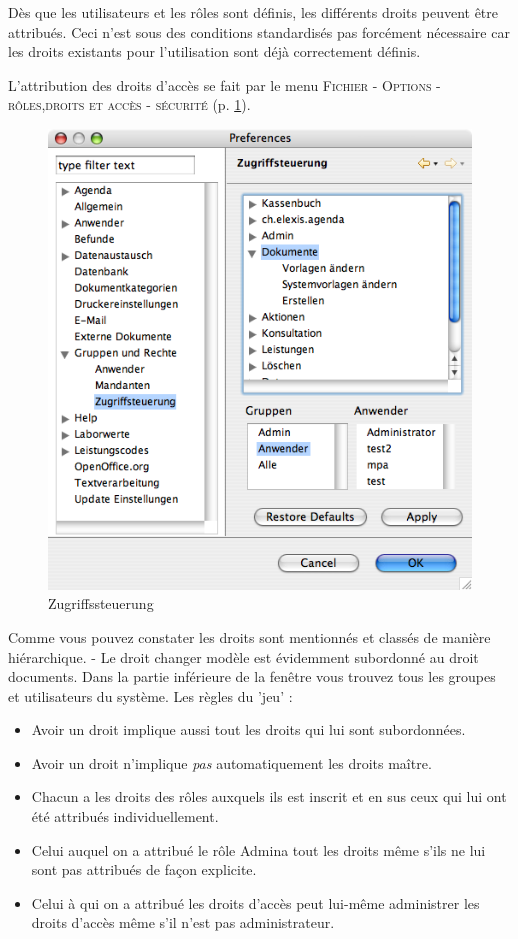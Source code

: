 Dès que les utilisateurs et les rôles sont définis, les différents droits peuvent être attribués. Ceci n'est sous des conditions standardisés pas forcément nécessaire car les droits existants pour l'utilisation sont déjà correctement définis.

L'attribution des droits d'accès se fait par le menu \textsc{Fichier -
Options - rôles,droits et accès  - sécurité} (p. \ref{fig:zugriff}).
\begin{figure}[htp]
\begin{center}
  \includegraphics{images/zugriff}
  \caption{Zugriffssteuerung}
  \label{fig:zugriff}
\end{center}
\end{figure}

Comme vous pouvez constater les droits sont mentionnés et classés de manière hiérarchique.  -
Le droit \glqq changer modèle\grqq{} est évidemment subordonné au droit \glqq
documents\grqq{}. Dans la partie inférieure de la fenêtre vous trouvez tous les groupes et utilisateurs du système. 
Les règles du 'jeu' :
\begin{itemize}
  \item Avoir un droit implique aussi tout les droits qui lui sont subordonnées.
  \item Avoir un droit n'implique \textit{pas} automatiquement les droits maître.
  \item Chacun a les droits des rôles auxquels ils est inscrit et en sus ceux qui lui ont été attribués individuellement.
  \item Celui auquel on a attribué le rôle \glqq Admin\grqq a tout les droits même s'ils ne lui sont pas attribués de façon explicite.
  \item Celui à qui on a attribué \glqq les droits d'accès \grqq peut lui-même administrer les droits d'accès même s'il n'est pas administrateur.
\end{itemize}

